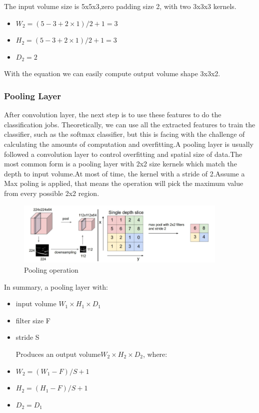 \documentclass[12pt,a4paper]{report}
\begin{document}
The input volume size is 5x5x3,zero padding size 2, with two 3x3x3 kernels.
\begin{itemize}
\item $W_2=(5-3+2 \times 1)/2+1=3$
\item $H_2=(5-3+2 \times 1)/2+1=3$
\item $D_2=2$
\end{itemize}
With the equation we can easily compute output volume shape 3x3x2.

\newpage
\subsubsection{Pooling Layer}
After convolution layer, the next step is to use these features to do the classification jobs. Theoretically, we can use all the extracted features to train the classifier, such as the softmax classifier, but this is facing with the challenge of calculating the amounts of computation and overfitting.A pooling layer is usually followed a convolution layer to control overfitting and spatial size of data.The most common form is a pooling layer with 2x2 size kernels which match the depth to input volume.At most of time, the kernel with a stride of 2.Assume a Max poling is applied, that means the operation will pick the maximum value from every possible  2x2 region.

\begin{figure}[h]
\centering
\includegraphics[width=0.9\textwidth]{pooling.png}
\caption{Pooling operation}
\end{figure}
In summary, a pooling layer with:
\begin{itemize} 
\item input volume $W_1 \times H_1 \times D_1$
\item filter size F
\item stride S

Produces an output volume$W_2 \times H_2 \times D_2$, where:
\item $W_2=(W_1-F)/S+1$
\item $H_2=(H_1-F)/S+1$
\item $D_2=D_1$
\end{itemize}
\end{document}
